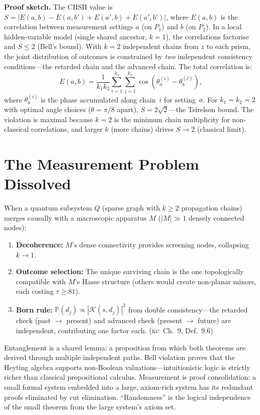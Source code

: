 \documentclass[11pt, a4paper, openany]{book}
\newcommand{\KC}[1]{\textnormal{(\textsc{kc}~#1)}}
\newcounter{thm}[chapter]
\begin{document}
\noindent
\textbf{Proof sketch.} The CHSH value is
$S = |E(a,b) - E(a,b') + E(a',b) + E(a',b')|$, where $E(a,b)$
is the correlation between measurement settings $a$ (on $P_1$) and
$b$ (on $P_2$). In a local hidden-variable model (single shared
ancestor, $k = 1$), the correlations factorise and $S \le 2$
(Bell's bound). With $k = 2$ independent chains from $z$ to each
prism, the joint distribution of outcomes is constrained by
\emph{two} independent consistency conditions---the retarded chain
and the advanced chain. The total correlation is:
\[
  E(a,b) = \frac{1}{k_1 k_2}\sum_{i=1}^{k_1}\sum_{j=1}^{k_2}
  \cos(\theta_a^{(i)} - \theta_b^{(j)}),
\]
where $\theta_a^{(i)}$ is the phase accumulated along chain~$i$ for
setting~$a$. For $k_1 = k_2 = 2$ with optimal angle choices
($\theta = \pi/8$ apart), $S = 2\sqrt{2}$---the Tsirelson bound.
The violation is maximal because $k = 2$ is the minimum chain
multiplicity for non-classical correlations, and larger $k$ (more
chains) drives $S \to 2$ (classical limit).

\section{The Measurement Problem Dissolved}\label{sec:measurement}

\begin{theorem}\label{thm:collapse}
When a quantum subsystem $Q$ (sparse graph with $k \ge 2$ propagation chains) merges causally with a macroscopic apparatus $M$ ($|M| \gg 1$ densely connected nodes):
\begin{enumerate}
  \item \textbf{Decoherence:} $M$'s dense connectivity provides screening nodes, collapsing $k \to 1$.
  \item \textbf{Outcome selection:} The unique surviving chain is the one topologically compatible with $M$'s Hasse structure (others would create non-planar minors, each costing $\tau \geq 81$).
  \item \textbf{Born rule:} $\mathbb{P}(d_j) \propto |\mathcal{K}(s,d_j)|^2$ from double consistency---the retarded check (past $\to$ present) and advanced check (present $\to$ future) are independent, contributing one factor each. \KC{Ch.~9, Def.~9.6}
\end{enumerate}
\end{theorem}

\begin{logicalreading}
Entanglement is a shared lemma: a proposition from which both theorems are derived through multiple independent paths. Bell violation proves that the Heyting algebra supports non-Boolean valuations---intuitionistic logic is strictly richer than classical propositional calculus. Measurement is proof consolidation: a small formal system embedded into a large, axiom-rich system has its redundant proofs eliminated by cut elimination. ``Randomness'' is the logical independence of the small theorem from the large system's axiom set.
\end{logicalreading}
\end{document}
